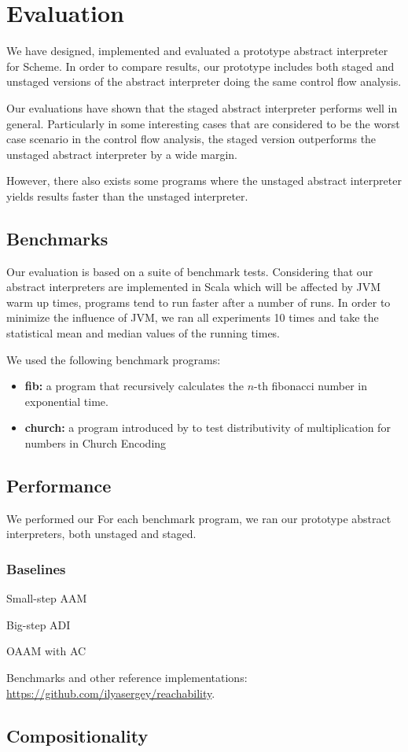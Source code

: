 \section{Evaluation} \label{evaluation}

We have designed, implemented and evaluated a prototype abstract interpreter for Scheme.
In order to compare results, our prototype includes both staged and unstaged versions of
the abstract interpreter doing the same control flow analysis.

Our evaluations have shown that the staged abstract interpreter performs well in general.
Particularly in some interesting cases that are considered to be the worst case scenario
in the control flow analysis, the staged version outperforms the unstaged abstract 
interpreter by a wide margin. 

However, there also exists some programs where the unstaged abstract interpreter yields 
results faster than the unstaged interpreter.

\subsection{Benchmarks}

Our evaluation is based on a suite of benchmark tests. Considering that our abstract 
interpreters are implemented in Scala which will be affected by JVM warm up times, programs
tend to run faster after a number of runs. In order to minimize the influence of JVM, 
we ran all experiments 10 times and take the statistical mean and median values of 
the running times.

We used the following benchmark programs:
\begin{itemize}
    \item \textbf{fib:} a program that recursively calculates the $n$-th fibonacci number in
        exponential time.
    \item \textbf{church:} a program introduced by  to test distributivity of multiplication for numbers in Church Encoding 
\end{itemize}

\subsection{Performance}
We performed our 
For each benchmark program, we ran our prototype abstract interpreters, both unstaged and staged.


\subsubsection{Baselines}
Small-step AAM

Big-step ADI

OAAM with AC \cite{Boucher:1996:ACN:647473.727587, Johnson:2013:OAA:2500365.2500604}

Benchmarks and other reference implementations: \url{https://github.com/ilyasergey/reachability}.

\subsection{Compositionality}


